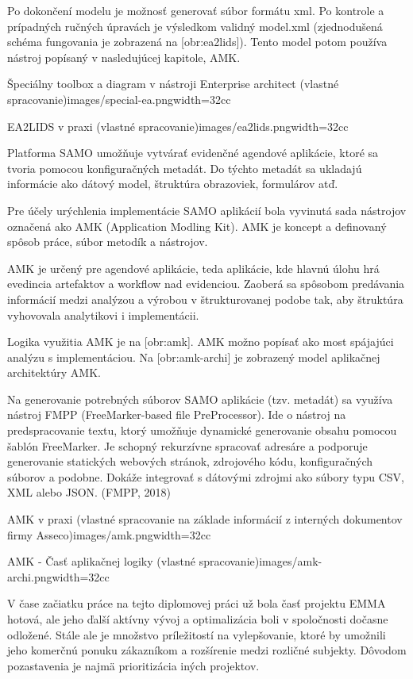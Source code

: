Po dokončení modelu je možnosť generovať súbor formátu xml. Po kontrole a prípadných ručných úpravách je výsledkom validný model.xml (zjednodušená schéma fungovania je zobrazená na [obr:ea2lids]). Tento model potom používa nástroj popísaný v nasledujúcej kapitole, AMK.

{Špeciálny toolbox a diagram v nástroji Enterprise architect (vlastné spracovanie)}{images/special-ea.png}{width=32cc}

{EA2LIDS v praxi (vlastné spracovanie)}{images/ea2lids.png}{width=32cc}

Platforma SAMO umožňuje vytvárať evidenčné agendové aplikácie, ktoré sa tvoria pomocou konfiguračných metadát. Do týchto metadát sa ukladajú informácie ako dátový model, štruktúra obrazoviek, formulárov atď.

Pre účely urýchlenia implementácie SAMO aplikácií bola vyvinutá sada nástrojov označená ako AMK (Application Modling Kit). AMK je koncept a definovaný spôsob práce, súbor metodík a nástrojov. 

AMK je určený pre agendové aplikácie, teda aplikácie, kde hlavnú úlohu hrá evedincia artefaktov a workflow nad evidenciou. Zaoberá sa spôsobom predávania informácií medzi analýzou a výrobou v štrukturovanej podobe tak, aby štruktúra vyhovovala analytikovi i implementácii.

Logika využitia AMK je na [obr:amk]. AMK možno popísať ako most spájajúci analýzu s implementáciou. Na [obr:amk-archi] je zobrazený model aplikačnej architektúry AMK.

Na generovanie potrebných súborov SAMO aplikácie (tzv. metadát) sa využíva nástroj FMPP (FreeMarker-based file PreProcessor). Ide o nástroj na predspracovanie textu, ktorý umožňuje dynamické generovanie obsahu pomocou šablón FreeMarker. Je schopný rekurzívne spracovať adresáre a podporuje generovanie statických webových stránok, zdrojového kódu, konfiguračných súborov a podobne. Dokáže integrovať s dátovými zdrojmi ako súbory typu CSV, XML alebo JSON. \scr(FMPP, 2018)

{AMK v praxi (vlastné spracovanie na základe informácií z interných dokumentov firmy Asseco)}{images/amk.png}{width=32cc}

{AMK - Časť aplikačnej logiky (vlastné spracovanie)}{images/amk-archi.png}{width=32cc}

\zlom
{}
V čase začiatku práce na tejto diplomovej práci už bola časť projektu EMMA hotová, ale  jeho ďalší aktívny vývoj a optimalizácia boli v spoločnosti dočasne odložené. Stále ale je množstvo príležitostí na vylepšovanie, ktoré by umožnili jeho komerčnú ponuku zákazníkom a rozšírenie medzi rozličné subjekty. Dôvodom pozastavenia je najmä prioritizácia iných projektov.

